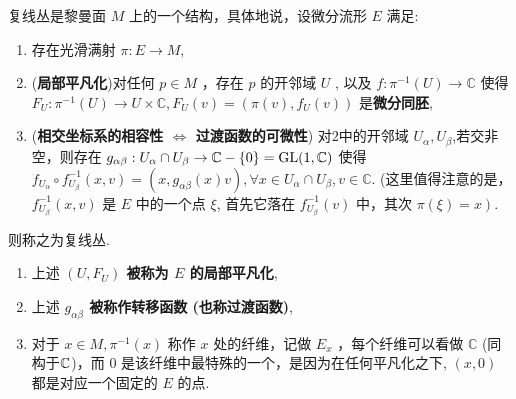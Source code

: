 \begin{definition}
    复线丛是黎曼面 $M$ 上的一个结构，具体地说，设微分流形 $E$ 满足:
    \begin{enumerate}
        \item 存在光滑满射 $\pi: E\rightarrow M$,
        \item (\textbf{局部平凡化})对任何 $p \in M$ ，存在 $p$ 的开邻域 $U$ , 以及 $f: \pi^{-1}(U) \rightarrow \mathbb{C}$ 使得 $F_U: \pi^{-1}(U) \rightarrow U \times \mathbb{C},  F_U(v)=\left(\pi(v), f_U(v)\right)$ 是\textbf{微分同胚},
        \item (\textbf{相交坐标系的相容性 $\iff$ 过渡函数的可微性}) 对$2$中的开邻域 $U_\alpha, U_\beta$,若交非空，则存在 $g_{\alpha \beta}: U_\alpha \cap U_\beta \rightarrow \mathbb{C}-\{0\}=\mathrm{GL}(1,{\mathbb C})$ 使得 $f_{U_\alpha} \circ f_{U_\beta}^{-1}(x, v)=\left(x, g_{\alpha \beta}(x) v\right) , \forall x \in U_\alpha \cap U_\beta, v \in \mathbb{C}$. (这里值得注意的是， $f_{U_\beta}^{-1}(x, v)$ 是 $E$ 中的一个点 $\xi $,  首先它落在 $f_{U_\beta}^{-1}(v)$ 中，其次 $\left.\pi(\xi)=x\right)$.
    \end{enumerate}
则称之为复线丛.
\end{definition}
\begin{remark}
    \begin{enumerate}
        \item 上述\textbf{ $\left(U, F_U\right)$ 被称为 $E$ 的局部平凡化},
        \item 上述\textbf{ $g_{\alpha \beta}$ 被称作转移函数 (也称过渡函数)},
        \item 对于 $x \in M , \pi^{-1}(x)$ 称作 $x$ 处的纤维，记做 $E_x$ ，每个纤维可以看做 $\mathbb{C}$ (同构于${\mathbb C}$)，而 $0$ 是该纤维中最特殊的一个，是因为在任何平凡化之下,  $(x, 0)$ 都是对应一个固定的 $E$ 的点.
    \end{enumerate}
\end{remark}

